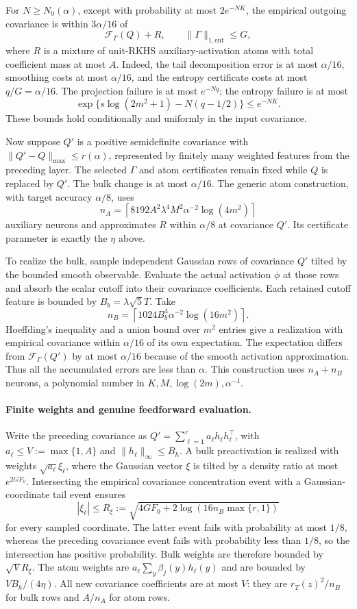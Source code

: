 For $N\ge N_0(\alpha)$, except with probability at most $2e^{-NK}$,
the empirical outgoing covariance is within $3\alpha/16$ of
\[
 \mathcal F_\Gamma(Q)+R,\qquad
 \|\Gamma\|_{1,\mathrm{ent}}\le G,
\]
where $R$ is a mixture of unit-RKHS auxiliary-activation atoms with total
coefficient mass at most $A$. Indeed, the tail decomposition error is at
most $\alpha/16$, smoothing costs at most $\alpha/16$, and the entropy
certificate costs at most $q/G=\alpha/16$. The projection failure is
at most $e^{-Nq}$; the entropy failure is at most
\[
 \exp\{s\log(2m^2+1)-N(q-1/2)\}\le e^{-NK}.
\]
These bounds hold conditionally and uniformly in the input covariance.

Now suppose $Q'$ is a positive semidefinite covariance with
$\|Q'-Q\|_{\max}\le r(\alpha)$, represented by finitely many weighted
features from the preceding layer. The selected $\Gamma$ and atom
certificates remain fixed while $Q$ is replaced by $Q'$. The bulk change
is at most $\alpha/16$. The generic atom construction, with target
accuracy $\alpha/8$, uses
\[
 n_A=\left\lceil8192A^2\lambda^4M^2\alpha^{-2}\log(4m^2)\right\rceil
\]
auxiliary neurons and approximates $R$ within $\alpha/8$ at covariance
$Q'$. Its certificate parameter is exactly the $\eta$ above.

To realize the bulk, sample independent Gaussian rows of covariance
$Q'$ tilted by the bounded smooth observable. Evaluate the actual
activation $\phi$ at those rows and absorb the scalar cutoff into their
covariance coefficients. Each retained cutoff feature is bounded by
$B_b=\lambda\sqrt5T$. Take
\[
 n_B=\left\lceil1024B_b^4\alpha^{-2}\log(16m^2)\right\rceil.
\]
Hoeffding's inequality and a union bound over $m^2$ entries give a
realization with empirical covariance within $\alpha/16$ of its own
expectation. The expectation differs from
$\mathcal F_\Gamma(Q')$ by at most $\alpha/16$ because of the smooth
activation approximation. Thus all the accumulated errors are less than
$\alpha$. This construction uses $n_A+n_B$ neurons, a polynomial number
in $K,M,\log(2m),\alpha^{-1}$.

\paragraph{Finite weights and genuine feedforward evaluation.}
Write the preceding covariance as
$Q'=\sum_{\ell=1}^r a_\ell h_\ell h_\ell^\top$, with
$a_\ell\le V:=\max\{1,A\}$ and $\|h_\ell\|_\infty\le B_h$.
A bulk preactivation is realized with weights
$\sqrt{a_\ell}\xi_\ell$, where the Gaussian vector $\xi$ is tilted by
a density ratio at most $e^{2GF_0}$. Intersecting the empirical covariance
concentration event with a Gaussian-coordinate tail event ensures
\[
 |\xi_\ell|\le R_\xi
 :=\sqrt{4GF_0+2\log(16n_B\max\{r,1\})}
\]
for every sampled coordinate. The latter event fails with probability
at most $1/8$, whereas the preceding covariance event fails with
probability less than $1/8$, so the intersection has positive probability.
Bulk weights are therefore bounded by $\sqrt V R_\xi$.
The atom weights are $a_\ell\sum_y\beta_j(y)h_\ell(y)$ and are bounded
by $VB_h/(4\eta)$. All new covariance coefficients are at most $V$:
they are $r_T(z)^2/n_B$ for bulk rows and $A/n_A$ for atom rows.

